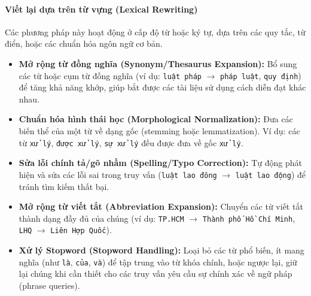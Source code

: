 \paragraph{Viết lại dựa trên từ vựng (Lexical Rewriting)}
Các phương pháp này hoạt động ở cấp độ từ hoặc ký tự, dựa trên các quy tắc, từ điển, hoặc các chuẩn hóa ngôn ngữ cơ bản.
\begin{itemize}
	\item \textbf{Mở rộng từ đồng nghĩa (Synonym/Thesaurus Expansion):} Bổ sung các từ hoặc cụm từ đồng nghĩa (ví dụ: \texttt{luật pháp} $\rightarrow$ \texttt{pháp luật}, \texttt{quy định}) để tăng khả năng khớp, giúp bắt được các tài liệu sử dụng cách diễn đạt khác nhau.
	\item \textbf{Chuẩn hóa hình thái học (Morphological Normalization):} Đưa các biến thể của một từ về dạng gốc (stemming hoặc lemmatization). Ví dụ: các từ \texttt{xử lý}, \texttt{được xử lý}, \texttt{sự xử lý} đều được đưa về gốc \texttt{xử lý}.
	\item \textbf{Sửa lỗi chính tả/gõ nhầm (Spelling/Typo Correction):} Tự động phát hiện và sửa các lỗi sai trong truy vấn (\texttt{luật lao đông} $\rightarrow$ \texttt{luật lao động}) để tránh tìm kiếm thất bại.
	\item \textbf{Mở rộng từ viết tắt (Abbreviation Expansion):} Chuyển các từ viết tắt thành dạng đầy đủ của chúng (ví dụ: \texttt{TP.HCM} $\rightarrow$ \texttt{Thành phố Hồ Chí Minh}, \texttt{LHQ} $\rightarrow$ \texttt{Liên Hợp Quốc}).
	\item \textbf{Xử lý Stopword (Stopword Handling):} Loại bỏ các từ phổ biến, ít mang nghĩa (như \texttt{là}, \texttt{của}, \texttt{và}) để tập trung vào từ khóa chính, hoặc ngược lại, giữ lại chúng khi cần thiết cho các truy vấn yêu cầu sự chính xác về ngữ pháp (phrase queries).
\end{itemize}

